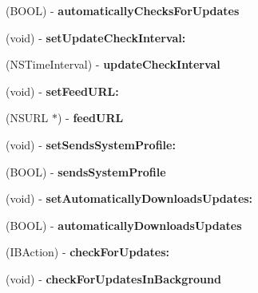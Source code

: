 \begin{DoxyCompactItemize}
(B\+O\+OL) -\/ {\bfseries automatically\+Checks\+For\+Updates}
\item 
\mbox{\label{interface_s_u_updater_a6ec815c3716bdd1e7d9f611497070765}} 
(void) -\/ {\bfseries set\+Update\+Check\+Interval\+:}
\item 
\mbox{\label{interface_s_u_updater_a6ea74060ff35e0af22350dc8bba0d47b}} 
(N\+S\+Time\+Interval) -\/ {\bfseries update\+Check\+Interval}
\item 
\mbox{\label{interface_s_u_updater_aebf52689edbf7d167facb4bdf7ec4945}} 
(void) -\/ {\bfseries set\+Feed\+U\+R\+L\+:}
\item 
\mbox{\label{interface_s_u_updater_ae6c1445bd69ebb04874f7bef86a869f7}} 
(N\+S\+U\+RL $\ast$) -\/ {\bfseries feed\+U\+RL}
\item 
\mbox{\label{interface_s_u_updater_a0172c3a00dd9f4d1bea7e565f4a0677d}} 
(void) -\/ {\bfseries set\+Sends\+System\+Profile\+:}
\item 
\mbox{\label{interface_s_u_updater_a993b24444f00a8834600cf0ccdc6fca0}} 
(B\+O\+OL) -\/ {\bfseries sends\+System\+Profile}
\item 
\mbox{\label{interface_s_u_updater_afbe0599644f4d64e807728b3863116b7}} 
(void) -\/ {\bfseries set\+Automatically\+Downloads\+Updates\+:}
\item 
\mbox{\label{interface_s_u_updater_a40b5d37d68f0607ae602c75aa171ead9}} 
(B\+O\+OL) -\/ {\bfseries automatically\+Downloads\+Updates}
\item 
\mbox{\label{interface_s_u_updater_a283c6354fb1c1f7a853f0b2871d79802}} 
(I\+B\+Action) -\/ {\bfseries check\+For\+Updates\+:}
\item 
\mbox{\label{interface_s_u_updater_abdb91f3abfe5f06bcef7d92d21e60962}} 
(void) -\/ {\bfseries check\+For\+Updates\+In\+Background}
\item 
\mbox{\label{interface_s_u_updater_a340afae2e8f5e31bc614ebbd39b16796}} 

\end{DoxyCompactItemize}
